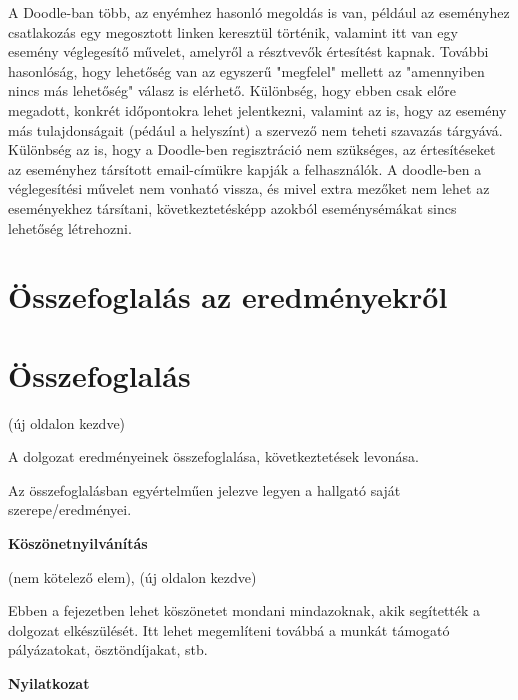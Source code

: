 \documentclass[a4paper,12pt]{report}
\theoremstyle{definition}
\theoremstyle{remark}
\begin{document}
A Doodle-ban több, az enyémhez hasonló megoldás is van, például az eseményhez csatlakozás egy megosztott linken keresztül történik, valamint itt van egy esemény véglegesítő művelet, amelyről a résztvevők értesítést kapnak.  További hasonlóság, hogy lehetőség van az egyszerű "megfelel" mellett az "amennyiben nincs más lehetőség" válasz is elérhető. Különbség, hogy ebben csak előre megadott, konkrét időpontokra lehet jelentkezni, valamint az is, hogy az esemény más tulajdonságait (pédául a helyszínt) a szervező nem teheti szavazás tárgyává. Különbség az is, hogy a Doodle-ben regisztráció nem szükséges, az értesítéseket az eseményhez társított email-címükre kapják a felhasználók. A doodle-ben a véglegesítési művelet nem vonható vissza, és mivel extra mezőket nem lehet az eseményekhez társítani, következtetésképp azokból eseménysémákat sincs lehetőség létrehozni.

\chapter{Összefoglalás az eredményekről}

\chapter{Összefoglalás}

(új oldalon kezdve)

A dolgozat eredményeinek összefoglalása, következtetések levonása.

Az összefoglalásban egyértelműen jelezve legyen a hallgató saját szerepe/eredményei.

\newpage


 

\newpage
{\Huge \bf Köszönetnyilvánítás}


\vspace{2 cm}

(nem kötelező elem), (új oldalon kezdve) 

Ebben a fejezetben lehet köszönetet mondani mindazoknak, akik segítették a dolgozat elkészülését. Itt lehet megemlíteni továbbá a munkát támogató pályázatokat, ösztöndíjakat, stb.

\newpage
{\Huge \bf Nyilatkozat}


\vspace{2 cm}
\end{document}
